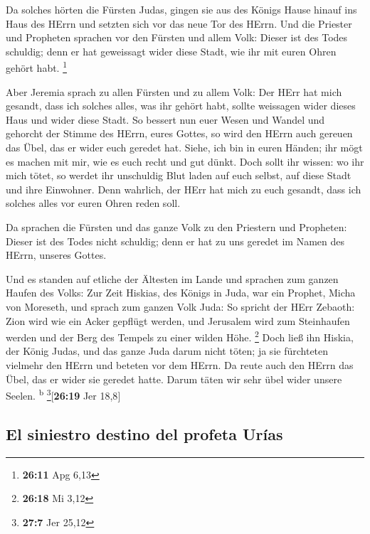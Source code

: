  Da solches hörten die Fürsten Judas, gingen sie aus des
Königs Hause hinauf ins Haus des HErrn und setzten sich vor das neue Tor
des HErrn.  Und die Priester und Propheten sprachen vor
den Fürsten und allem Volk: Dieser ist des Todes schuldig; denn er hat
geweissagt wider diese Stadt, wie ihr mit euren Ohren gehört habt.
\footnote{\textbf{26:11} Apg 6,13}

 Aber Jeremia sprach zu allen Fürsten und zu allem Volk:
Der HErr hat mich gesandt, dass ich solches alles, was ihr gehört habt,
sollte weissagen wider dieses Haus und wider diese Stadt.
 So bessert nun euer Wesen und Wandel und gehorcht der
Stimme des HErrn, eures Gottes, so wird den HErrn auch gereuen das Übel,
das er wider euch geredet hat.  Siehe, ich bin in euren
Händen; ihr mögt es machen mit mir, wie es euch recht und gut dünkt.
 Doch sollt ihr wissen: wo ihr mich tötet, so werdet ihr
unschuldig Blut laden auf euch selbst, auf diese Stadt und ihre
Einwohner. Denn wahrlich, der HErr hat mich zu euch gesandt, dass ich
solches alles vor euren Ohren reden soll.

 Da sprachen die Fürsten und das ganze Volk zu den
Priestern und Propheten: Dieser ist des Todes nicht schuldig; denn er
hat zu uns geredet im Namen des HErrn, unseres Gottes.

 Und es standen auf etliche der Ältesten im Lande und
sprachen zum ganzen Haufen des Volks:  Zur Zeit Hiskias,
des Königs in Juda, war ein Prophet, Micha von Moreseth, und sprach zum
ganzen Volk Juda: So spricht der HErr Zebaoth: Zion wird wie ein Acker
gepflügt werden, und Jerusalem wird zum Steinhaufen werden und der Berg
des Tempels zu einer wilden Höhe. \footnote{\textbf{26:18} Mi 3,12}
 Doch ließ ihn Hiskia, der König Judas, und das ganze
Juda darum nicht töten; ja sie fürchteten vielmehr den HErrn und beteten
vor dem HErrn. Da reute auch den HErrn das Übel, das er wider sie
geredet hatte. Darum täten wir sehr übel wider unsere Seelen.
\textsuperscript{b} \footnote{\textbf{27:7} Jer 25,12}{[}\textbf{26:19}
Jer 18,8{]}

\hypertarget{el-siniestro-destino-del-profeta-uruxedas}{%
\subsection{El siniestro destino del profeta
Urías}\label{el-siniestro-destino-del-profeta-uruxedas}}

